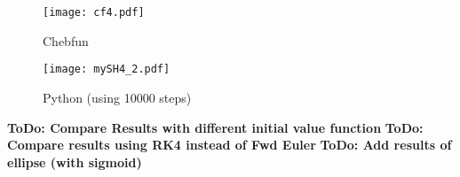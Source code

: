 \documentclass[12pt]{article}
\begin{document}
\begin{figure}
\centering
\parbox{7cm}{
\texttt{[image: cf4.pdf]}
\caption{Chebfun}
\label{fig:2figsA}}
\qquad
\begin{minipage}{7cm}
\texttt{[image: mySH4\_2.pdf]}
\caption{Python (using 10000 steps)}
\label{fig:2figsB}
\end{minipage}
\end{figure}

\textbf{ToDo: Compare Results with different initial value function}
\textbf{ToDo: Compare results using RK4 instead of Fwd Euler}
\textbf{ToDo: Add results of ellipse (with sigmoid)}
\end{document}
